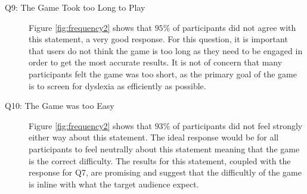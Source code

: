 \documentclass[journal]{IEEEtran}
\begin{document}
\begin{description}
\item[Q9: The Game Took too Long to Play]
Figure \ref{fig:frequency2} shows that $95\%$ of participants did not agree with this statement, a very good response. For this question, it is important that users do not think the game is too long as they need to be engaged in order to get the most accurate results. It is not of concern that many participants felt the game was too short, as the primary goal of the game is to screen for dyslexia as efficiently as possible.

\item[Q10: The Game was too Easy]
Figure \ref{fig:frequency2} shows that $93\%$ of participants did not feel strongly either way about this statement. The ideal response would be for all participants to feel neutrally about this statement meaning that the game is the correct difficulty. The results for this statement, coupled with the response for Q7, are promising and suggest that the difficultly of the game is inline with what the target audience expect.
\end{description}
\end{document}
